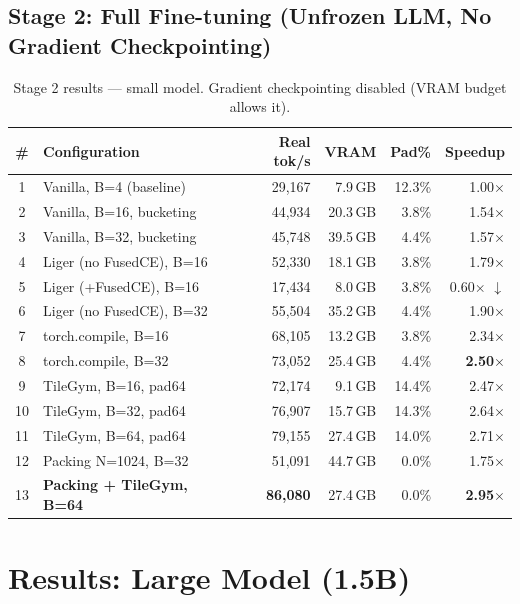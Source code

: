 \documentclass[11pt,a4paper]{article}
\begin{document}
\subsection{Stage 2: Full Fine-tuning (Unfrozen LLM, No Gradient Checkpointing)}

\begin{table}[H]
\centering
\caption{Stage 2 results --- small model. Gradient checkpointing disabled (VRAM budget allows it).}
\label{tab:s2_small}
\small
\begin{tabular}{@{}clrrrr@{}}
\toprule
\# & Configuration & Real tok/s & VRAM & Pad\% & Speedup \\
\midrule
1 & Vanilla, B=4 (baseline) & 29,167 & 7.9\,GB & 12.3\% & 1.00$\times$ \\
2 & Vanilla, B=16, bucketing & 44,934 & 20.3\,GB & 3.8\% & 1.54$\times$ \\
3 & Vanilla, B=32, bucketing & 45,748 & 39.5\,GB & 4.4\% & 1.57$\times$ \\
\midrule
4 & Liger (no FusedCE), B=16 & 52,330 & 18.1\,GB & 3.8\% & 1.79$\times$ \\
5 & Liger (+FusedCE), B=16 & 17,434 & 8.0\,GB & 3.8\% & 0.60$\times$ {\color{red}$\downarrow$} \\
6 & Liger (no FusedCE), B=32 & 55,504 & 35.2\,GB & 4.4\% & 1.90$\times$ \\
\midrule
7 & torch.compile, B=16 & 68,105 & 13.2\,GB & 3.8\% & 2.34$\times$ \\
8 & torch.compile, B=32 & 73,052 & 25.4\,GB & 4.4\% & \textbf{2.50$\times$} \\
\midrule
9 & TileGym, B=16, pad64 & 72,174 & 9.1\,GB & 14.4\% & 2.47$\times$ \\
10 & TileGym, B=32, pad64 & 76,907 & 15.7\,GB & 14.3\% & 2.64$\times$ \\
11 & TileGym, B=64, pad64 & 79,155 & 27.4\,GB & 14.0\% & 2.71$\times$ \\
\midrule
12 & Packing N=1024, B=32 & 51,091 & 44.7\,GB & 0.0\% & 1.75$\times$ \\
13 & \textbf{Packing + TileGym, B=64} & \textbf{86,080} & 27.4\,GB & 0.0\% & \textbf{2.95$\times$} \\
\bottomrule
\end{tabular}
\end{table}

\section{Results: Large Model (1.5B)}
\label{sec:results_large}
\end{document}
